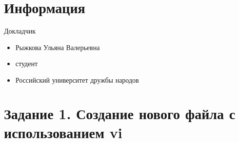 \hypertarget{ux438ux43dux444ux43eux440ux43cux430ux446ux438ux44f}{%
\section{Информация}\label{ux438ux43dux444ux43eux440ux43cux430ux446ux438ux44f}}

\begin{frame}{Докладчик}
\protect\hypertarget{ux434ux43eux43aux43bux430ux434ux447ux438ux43a}{}
\begin{itemize}
\tightlist
\item
  Рыжкова Ульяна Валерьевна
\item
  студент
\item
  Российский университет дружбы народов
\end{itemize}
\end{frame}

\hypertarget{ux437ux430ux434ux430ux43dux438ux435-1.-ux441ux43eux437ux434ux430ux43dux438ux435-ux43dux43eux432ux43eux433ux43e-ux444ux430ux439ux43bux430-ux441-ux438ux441ux43fux43eux43bux44cux437ux43eux432ux430ux43dux438ux435ux43c-vi}{%
\section{Задание 1. Создание нового файла с использованием
vi}\label{ux437ux430ux434ux430ux43dux438ux435-1.-ux441ux43eux437ux434ux430ux43dux438ux435-ux43dux43eux432ux43eux433ux43e-ux444ux430ux439ux43bux430-ux441-ux438ux441ux43fux43eux43bux44cux437ux43eux432ux430ux43dux438ux435ux43c-vi}}


